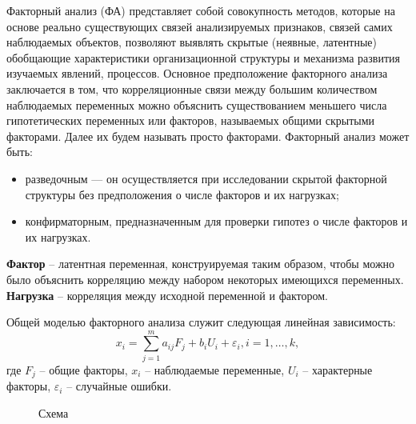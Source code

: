 \documentclass[a4paper, 12pt]{article}
\begin{document}
Факторный анализ (ФА) представляет собой совокупность методов, которые на основе реально существующих связей анализируемых признаков, связей самих наблюдаемых объектов, позволяют выявлять скрытые (неявные, латентные) обобщающие характеристики организационной структуры и механизма развития изучаемых явлений, процессов. Основное предположение факторного анализа заключается в том, что корреляционные связи между большим количеством наблюдаемых переменных можно объяснить существованием меньшего числа гипотетических переменных или факторов, называемых общими скрытыми факторами. Далее их будем называть просто факторами.
Факторный анализ может быть:
\begin{itemize}
    \item разведочным — он осуществляется при исследовании скрытой факторной структуры без предположения о числе факторов и их нагрузках;
    \item конфирматорным, предназначенным для проверки гипотез о числе факторов и их нагрузках.
\end{itemize}

\textbf{Фактор} – латентная переменная, конструируемая таким образом, чтобы можно было объяснить корреляцию между набором некоторых имеющихся переменных.
\textbf{Нагрузка} – корреляция между исходной переменной и фактором.

Общей моделью факторного анализа служит следующая линейная зависимость:
\begin{equation}
    x_i = \sum_{j=1}^m a_{i j} F_j+ b_i U_i + \varepsilon_i, i = 1, \dots, k,
\end{equation}
где $F_j$ -- общие факторы, $x_i$ -- наблюдаемые переменные, $U_i$ -- характерные факторы, $ \varepsilon_i$ -- случайные ошибки.

\begin{figure}[h!]
    \caption{Схема}
    \label{ris:image}
    \end{figure}
\end{document}
